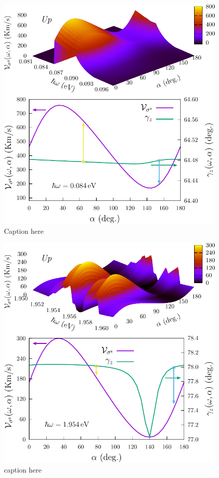 \documentclass[prb,11pt,tightenlines,twocolumn,aps]{revtex4-1}
\begin{document}
\begin{figure}[t]
    \centering
    \includegraphics[width=\linewidth]{upplots/up-vsz-w1}
    \caption{Caption here}
    \label{fig:up-vsz-w1}
\end{figure}

\begin{figure}[t]
    \centering
    \includegraphics[width=\linewidth]{upplots/up-vsz-w2}
    \caption{caption here}
    \label{fig:up-vsz-w2}
\end{figure}
\end{document}
